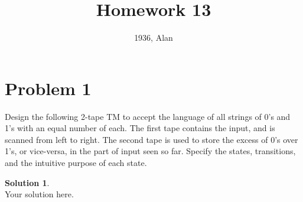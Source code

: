 \documentclass[a4paper,UTF8]{article}
\theoremstyle{definition}
\newtheorem*{solution}{Solution}
\begin{document}
\title{Homework 13}
\author{1936, Alan}
\maketitle

\section*{Problem 1}
Design the following 2-tape TM to accept the language of all strings of 0's and 1's with an equal number of each. The first tape contains the input, and is scanned from left to right. The second tape is used to store the excess of 0's over 1's, or vice-versa, in the part of input seen so far. Specify the states, transitions, and the intuitive purpose of each state.
\begin{solution}
	~\\
	Your solution here.
\end{solution}
\end{document}
